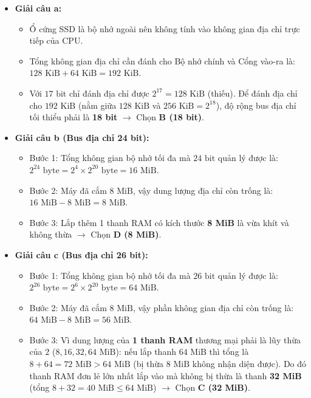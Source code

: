 \begin{itemize}
    \item \textbf{Giải câu a:}
    \begin{itemize}
        \item Ổ cứng SSD là bộ nhớ ngoài nên không tính vào không gian địa chỉ trực tiếp của CPU.
        \item Tổng không gian địa chỉ cần đánh cho Bộ nhớ chính và Cổng vào-ra là: $128\text{ KiB} + 64\text{ KiB} = 192\text{ KiB}$.
        \item Với $17\text{ bit}$ chỉ đánh địa chỉ được $2^{17} = 128\text{ KiB}$ (thiếu). Để đánh địa chỉ cho $192\text{ KiB}$ (nằm giữa $128\text{ KiB}$ và $256\text{ KiB} = 2^{18}$), độ rộng bus địa chỉ tối thiểu phải là \textbf{18 bit} $\rightarrow$ Chọn \textbf{B (18 bit)}.
    \end{itemize}
    \item \textbf{Giải câu b (Bus địa chỉ 24 bit):}
    \begin{itemize}
        \item Bước 1: Tổng không gian bộ nhớ tối đa mà $24\text{ bit}$ quản lý được là: $2^{24}\text{ byte} = 2^4 \times 2^{20}\text{ byte} = 16\text{ MiB}$.
        \item Bước 2: Máy đã cắm $8\text{ MiB}$, vậy dung lượng địa chỉ còn trống là: $16\text{ MiB} - 8\text{ MiB} = 8\text{ MiB}$.
        \item Bước 3: Lắp thêm 1 thanh RAM có kích thước \textbf{8 MiB} là vừa khít và không thừa $\rightarrow$ Chọn \textbf{D (8 MiB)}.
    \end{itemize}
    \item \textbf{Giải câu c (Bus địa chỉ 26 bit):}
    \begin{itemize}
        \item Bước 1: Tổng không gian bộ nhớ tối đa mà $26\text{ bit}$ quản lý được là: $2^{26}\text{ byte} = 2^6 \times 2^{20}\text{ byte} = 64\text{ MiB}$.
        \item Bước 2: Máy đã cắm $8\text{ MiB}$, vậy phần không gian địa chỉ còn trống là: $64\text{ MiB} - 8\text{ MiB} = 56\text{ MiB}$.
        \item Bước 3: Vì dung lượng của \textbf{1 thanh RAM} thương mại phải là lũy thừa của $2$ ($8, 16, 32, 64\text{ MiB}$): nếu lắp thanh $64\text{ MiB}$ thì tổng là $8 + 64 = 72\text{ MiB} > 64\text{ MiB}$ (bị thừa $8\text{ MiB}$ không nhận diện được). Do đó thanh RAM đơn lẻ lớn nhất lắp vào mà không bị thừa là thanh \textbf{32 MiB} (tổng $8 + 32 = 40\text{ MiB} \le 64\text{ MiB}$) $\rightarrow$ Chọn \textbf{C (32 MiB)}.
    \end{itemize}
\end{itemize}

